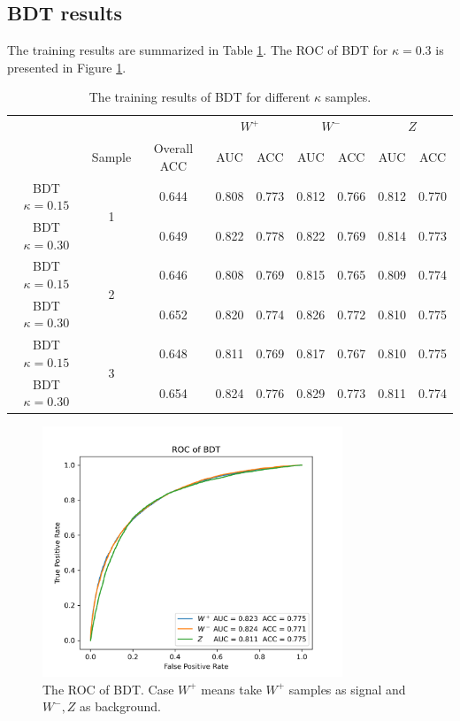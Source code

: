 \documentclass[12pt]{article}
\begin{document}
	\subsection{BDT results}%
	\label{sub:bdt_results}
		The training results are summarized in Table \ref{tab:BDT_training_result}. The ROC of BDT for $\kappa = 0.3$ is presented in Figure \ref{fig:ROC_of_BDT}. 
		\begin{table}[htpb]
			\centering
			\caption{The training results of BDT for different $\kappa$ samples.}
			\label{tab:BDT_training_result}
			\begin{tabular}{c|c|c|cc|cc|cc}
								  &					 &             & \multicolumn{2}{c|}{$W^{+}$} & \multicolumn{2}{c|}{$W^{-}$} & \multicolumn{2}{c}{$Z$} \\
								  & Sample			 & Overall ACC & AUC		  & ACC			 & AUC          & ACC		   & AUC        & ACC       \\ \hline
			    BDT $\kappa=0.15$ &\multirow{2}{*}{1}& 0.644 & 0.808 & 0.773 & 0.812 & 0.766 & 0.812 & 0.770 \\ 
				BDT $\kappa=0.30$ &                  & 0.649 & 0.822 & 0.778 & 0.822 & 0.769 & 0.814 & 0.773 \\ \hline
			    BDT $\kappa=0.15$ &\multirow{2}{*}{2}& 0.646 & 0.808 & 0.769 & 0.815 & 0.765 & 0.809 & 0.774 \\ 
			    BDT $\kappa=0.30$ &					 & 0.652 & 0.820 & 0.774 & 0.826 & 0.772 & 0.810 & 0.775 \\ \hline
			    BDT $\kappa=0.15$ &\multirow{2}{*}{3}& 0.648 & 0.811 & 0.769 & 0.817 & 0.767 & 0.810 & 0.775 \\ 
			    BDT $\kappa=0.30$ &					 & 0.654 & 0.824 & 0.776 & 0.829 & 0.773 & 0.811 & 0.774 \\
			\end{tabular}
		\end{table}

		\begin{figure}[htpb]
			\centering
			\includegraphics[width=0.8\textwidth]{ROC_BDT.png}
			\caption{The ROC of BDT. Case $W^{+}$ means take $W^{+}$ samples as signal and $W^{-}, Z$ as background.}
			\label{fig:ROC_of_BDT}
		\end{figure}
\end{document}
